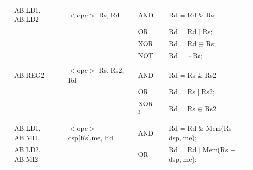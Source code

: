 \begin{table}
\begin{subtable}{\linewidth}
\begin{center}
\begin{tabular}{llllll}
                   & AB.LD1, AB.LD2    & $<$opc$>$ Rs, Rd                      & AND               & \flags{-**-}      & Rd = Rd \& Rs;                                                                \\
                   &                   &                                       & OR                & \flags{-**-}      & Rd = Rd $\mid$ Rs;                                                            \\
                   &                   &                                       & XOR               & \flags{-**-}      & Rd = Rd $\oplus$ Rs;                                                          \\
                   &                   &                                       & NOT               & \flags{-**-}      & Rd = $\sim$Rs;                                                                \\
                   &                   &                                       &                   &                   &                                                                               \\
                   & AB.REG2           & $<$opc$>$ Rs, Rs2, Rd                 & AND               & \flags{-**-}      & Rd = Rs \& Rs2;                                                               \\
                   &                   &                                       & OR                & \flags{-**-}      & Rd = Rs $\mid$ Rs2;                                                           \\
                   &                   &                                       & XOR$^3$           & \flags{-**-}      & Rd = Rs $\oplus$ Rs2;                                                         \\
                   &                   &                                       &                   &                   &                                                                               \\
                   & AB.LD1, AB.MI1,   & $<$opc$>$ dsp[Rs].me, Rd              & AND               & \flags{-**-}      & Rd = Rd \& Mem(Rs + dsp, me);                                                 \\
                   & AB.LD2, AB.MI2    &                                       & OR                & \flags{-**-}      & Rd = Rd $\mid$ Mem(Rs + dsp, me);                                             \\

\end{tabular}
\end{center}
\end{subtable}
\end{table}
